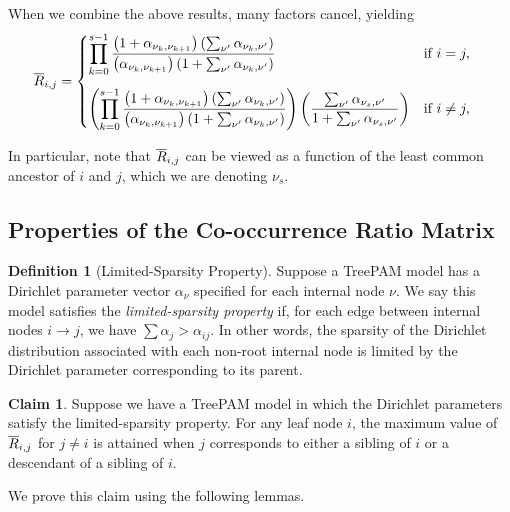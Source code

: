 \documentclass{article}
\theoremstyle{definition}
\newtheorem{claim}[thm]{Claim}
\newtheorem{defn}[thm]{Definition}
\begin{document}
When we combine the above results, many factors cancel, yielding
\begin{align}
\overline{R}_{i,j}
&=
\begin{cases}
\displaystyle
\prod_{k=0}^{s-1}
  \frac{ \left( 1 + \alpha_{\nu_k,\nu_{k+1}} \right) \left( \sum_{\nu'} \alpha_{\nu_k, \nu'} \right) }
       { \left( \alpha_{\nu_k,\nu_{k+1}} \right) \left( 1 + \sum_{\nu'} \alpha_{\nu_k, \nu'} \right) }
&
\text{if } i = j,
\\[4ex]
\displaystyle
\left(
  \prod_{k=0}^{s-1}
    \frac{ \left( 1 + \alpha_{\nu_k,\nu_{k+1}} \right) \left( \sum_{\nu'} \alpha_{\nu_k, \nu'} \right) }
         { \left( \alpha_{\nu_k,\nu_{k+1}} \right) \left( 1 + \sum_{\nu'} \alpha_{\nu_k, \nu'} \right) }
\right)
\left(
  \frac{\sum_{\nu'} \alpha_{\nu_s, \nu'}}
       {1 + \sum_{\nu'} \alpha_{\nu_s, \nu'}}
\right)
&
\text{if } i \neq j,
\end{cases}
\label{eqn:closedFormRbar}
\end{align}

In particular, note that $\overline{R}_{i,j}$ can be viewed as a function of the least common ancestor of $i$ and $j$, which we are denoting $\nu_s$.

\subsection{Properties of the Co-occurrence Ratio Matrix}

\begin{defn}[Limited-Sparsity Property]
Suppose a TreePAM model has a Dirichlet parameter vector $\alpha_\nu$ specified for each internal node $\nu$.
We say this model satisfies the \emph{limited-sparsity property} if, for each edge between internal nodes $i \to j$, we have $\sum \alpha_j > \alpha_{ij}$.
In other words, the sparsity of the Dirichlet distribution associated with each non-root internal node is limited by the Dirichlet parameter corresponding to its parent.
\end{defn}

\begin{claim}
Suppose we have a TreePAM model in which the Dirichlet parameters satisfy the limited-sparsity property.
For any leaf node $i$, the maximum value of $\overline{R}_{i,j}$ for $j \neq i$ is attained when $j$ corresponds to either a sibling of $i$ or a descendant of a sibling of $i$.
\label{claim:RbarMatrixProperty}
\end{claim}

We prove this claim using the following lemmas.
\end{document}

